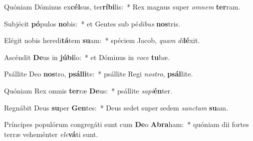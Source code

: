 \item Quóniam Dóminus ex\textbf{cél}sus, ter\textbf{rí}\textbf{bi}lis:~* Rex magnus super \textit{om}\textit{nem} \textbf{ter}ram.
\item Subjécit \textbf{pó}pulos \textbf{no}bis:~* et Gentes sub pé\textit{di}\textit{bus} \textbf{nos}tris.
\item Elégit nobis heredi\textbf{tá}tem \textbf{su}am:~* spéciem Jacob, \textit{quam} \textit{di}\textbf{lé}xit.
\item Ascéndit \textbf{De}us in \textbf{jú}\textbf{bi}lo:~* et Dóminus in \textit{vo}\textit{ce} \textbf{tu}bæ.
\item Psállite Deo \textbf{nos}tro, \textbf{psál}\textbf{li}te:~* psállite Regi \textit{nos}\textit{tro}, \textbf{psál}lite.
\item Quóniam Rex omnis \textbf{ter}ræ \textbf{De}us:~* psállite \textit{sa}\textit{pi}\textbf{én}ter.
\item Regnábit Deus \textbf{su}per \textbf{Gen}tes:~* Deus sedet super sedem \textit{sanc}\textit{tam} \textbf{su}am.
\item Príncipes populórum congregáti sunt cum \textbf{De}o \textbf{A}\textbf{bra}ham:~* quóniam dii fortes terræ veheménter \textit{e}\textit{le}\textbf{vá}ti sunt.
